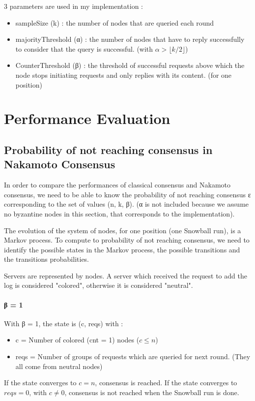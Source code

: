 \documentclass[11pt, twocolumn]{article}
\begin{document}
3 parameters are used in my implementation :
\begin{itemize}
    \item sampleSize (k) : the number of nodes that are queried each round
    \item majorityThreshold (α) : the number of nodes that have to reply successfully to consider that the query is successful.
          (with $\alpha > \lfloor k/2 \rfloor$)
    \item CounterThreshold (β) : the threshold of successful requests above which the node stops initiating requests and only replies with its content. (for one position)
\end{itemize}

\section{Performance Evaluation}
\subsection{Probability of not reaching consensus in Nakamoto Consensus}

In order to compare the performances of classical consensus and Nakamoto consensus, we need to be able to know the probability of not reaching consensus ε corresponding to the set
of values (n, k, β). (α is not included because we assume no byzantine nodes in this section, that corresponds to the implementation).

The evolution of the system of nodes, for one position (one Snowball run), is a Markov process. To compute to probability of not reaching consensus, we need to identify the possible states in the
Markov process, the possible transitions and the transitions probabilities.

Servers are represented by nodes. A server which received the request to add the log is considered "colored", otherwise it is considered "neutral". 

\paragraph{β = 1}
With β = 1, the state is (c, reqs) with :
\begin{itemize}
    \item c = Number of colored (cnt = 1) nodes ($c \leq n$)
    \item reqs = Number of groups of requests which are queried for next round. (They all come from neutral nodes)
\end{itemize}
If the state converges to $c = n$, consensus is reached.
If the state converges to $reqs = 0$, with $c \neq 0$, consensus is not reached when the Snowball run is done.
\end{document}

